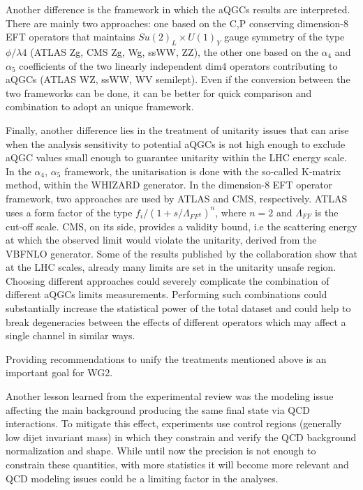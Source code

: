 Another difference is the framework in which the aQGCs results are interpreted. There are mainly two approaches: one based on the C,P conserving dimension-8 EFT operators that maintains $Su(2)_L \times U(1)_Y$ gauge symmetry of the type $\phi/\lambda{}4$ (ATLAS Zg, CMS Zg, Wg, ssWW, ZZ), the other one based on the $\alpha_4$ and $\alpha_5$ coefficients of the two linearly independent dim4 operators contributing to aQGCs (ATLAS WZ, ssWW, WV semilept). Even if the conversion between the two frameworks can be done, it can be better for quick comparison and combination to adopt an unique framework.

Finally, another difference lies in the treatment of unitarity issues that can arise when the analysis sensitivity to potential aQGCs is not high enough to exclude aQGC values small enough to guarantee unitarity within the LHC energy scale. In the $\alpha_4$, $\alpha_5$ framework, the unitarisation is done with the so-called K-matrix method, within the WHIZARD generator. In the dimension-8 EFT operator framework, two approaches are used by ATLAS and CMS, respectively. ATLAS uses a form factor of the type $f_i/(1+s/\Lambda_{FF^2})^n$, where $n=2$ and $\Lambda_{FF}$ is the cut-off scale. CMS, on its side, provides a validity bound, i.e the scattering energy at which the observed limit would violate the unitarity, derived from the VBFNLO generator. Some of the results published by the collaboration show that at the LHC scales, already many limits are set in the unitarity unsafe region. 
Choosing different approaches could severely complicate the combination of different aQGCs limits measurements. Performing such combinations could substantially increase the statistical power of the total dataset and could help to break degeneracies between the effects of different operators which may affect a single channel in similar ways.

Providing recommendations to unify the treatments mentioned above is an important goal for WG2. 

Another lesson learned from the experimental review was the modeling issue affecting the main background producing the same final state via QCD interactions. To mitigate this effect, experiments use control regions (generally low dijet invariant mass) in which they constrain and verify the QCD background normalization and shape. While until now the precision is not enough to constrain these quantities, with more statistics it will become more relevant and QCD modeling issues could be a limiting factor in the analyses.


